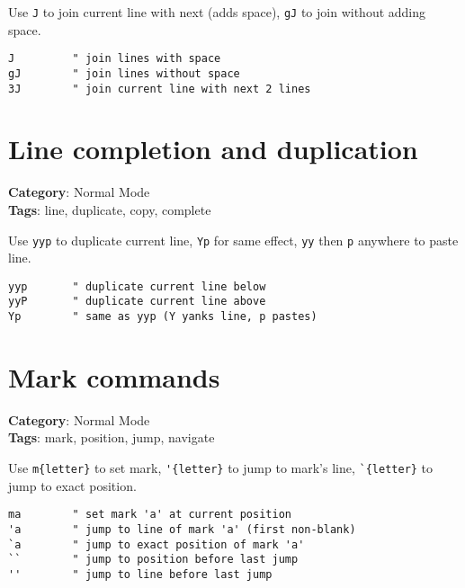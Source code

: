 {{{{{{{{{{Use {\footnotesize \Verb§J§} to join current line with next (adds space), {\footnotesize \Verb§gJ§} to join without adding space.

\begin{Exa*}{}
\begin{Verbatim}[fontsize=\footnotesize, breaklines, breakanywhere]
J         " join lines with space
gJ        " join lines without space
3J        " join current line with next 2 lines
\end{Verbatim}
\end{Exa*}

\section{Line completion and duplication}

\textbf{Category}: Normal Mode\\ \textbf{Tags}: line, duplicate, copy, complete
\vspace{0.5cm}

Use {\footnotesize \Verb§yyp§} to duplicate current line, {\footnotesize \Verb§Yp§} for same effect, {\footnotesize \Verb§yy§} then {\footnotesize \Verb§p§} anywhere to paste line.

\begin{Exa*}{}
\begin{Verbatim}[fontsize=\footnotesize, breaklines, breakanywhere]
yyp       " duplicate current line below
yyP       " duplicate current line above
Yp        " same as yyp (Y yanks line, p pastes)
\end{Verbatim}
\end{Exa*}

\section{Mark commands}

\textbf{Category}: Normal Mode\\ \textbf{Tags}: mark, position, jump, navigate
\vspace{0.5cm}

Use {\footnotesize \Verb§m{letter}§} to set mark, {\footnotesize \Verb§'{letter}§} to jump to mark's line, {\footnotesize \Verb§`{letter}§} to jump to exact position.

\begin{Exa*}{}
\begin{Verbatim}[fontsize=\footnotesize, breaklines, breakanywhere]
ma        " set mark 'a' at current position
'a        " jump to line of mark 'a' (first non-blank)
`a        " jump to exact position of mark 'a'
``        " jump to position before last jump
''        " jump to line before last jump
\end{Verbatim}
\end{Exa*}

}}}}}}}}}}
